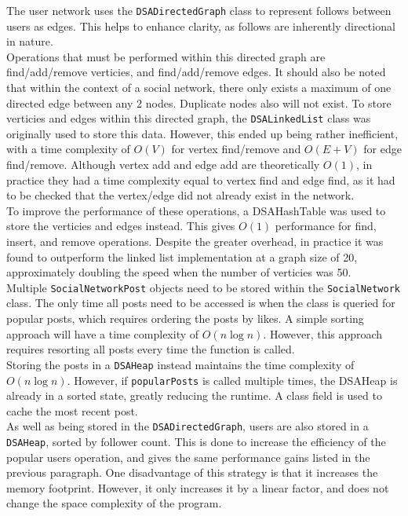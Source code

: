 \documentclass{article}
\begin{document}
The user network uses the \texttt{DSADirectedGraph} class to represent follows between users
as edges. This helps to enhance clarity, as follows are inherently directional in nature.\\

Operations that must be performed within this directed graph are find/add/remove verticies,
and find/add/remove edges. It should also be noted that within the context of a social network,
there only exists a maximum of one directed edge between any 2 nodes. Duplicate nodes also will not
exist.
To store verticies and edges within this directed graph, the \texttt{DSALinkedList} class was originally
used to store this data. However, this ended up being rather inefficient, with a time complexity of
$O\left(V\right)$ for vertex find/remove and $O\left(E + V\right)$ for edge find/remove.
Although vertex add and edge add are theoretically $O\left(1\right)$, in practice they had a time complexity
equal to vertex find and edge find, as it had to be checked that the vertex/edge did not already exist in the network.\\

To improve the performance of these operations, a DSAHashTable was used to store the verticies and edges instead.
This gives $O\left(1\right)$
performance for find, insert, and remove operations. Despite the greater overhead, in practice it was found to outperform
the linked list implementation at a graph size of 20, approximately doubling the speed when the number of verticies was 50.\\

Multiple \texttt{SocialNetworkPost} objects need to be stored within the \texttt{SocialNetwork} class.
The only time all posts need to be accessed
is when the class is queried for popular posts, which requires ordering the posts by likes.
A simple sorting approach will have a time complexity of $O\left(n\log n\right)$. However, this
approach requires resorting all posts every time the function is called.\\

Storing the posts in a \texttt{DSAHeap} instead maintains
the time complexity of $O\left(n\log n\right)$. However, if \texttt{popularPosts}
is called multiple times, the DSAHeap is already in a sorted state, greatly reducing the runtime.
A class field is used to cache the most recent post.\\

As well as being stored in the \texttt{DSADirectedGraph}, users are also stored in a \texttt{DSAHeap},
sorted by follower count. This is done to increase the efficiency of the popular users operation,
and gives the same performance gains listed in the previous paragraph.
One disadvantage of this strategy is that it increases the memory footprint. However, it only increases it
by a linear factor, and does not change the space complexity of the program.\\
\end{document}
